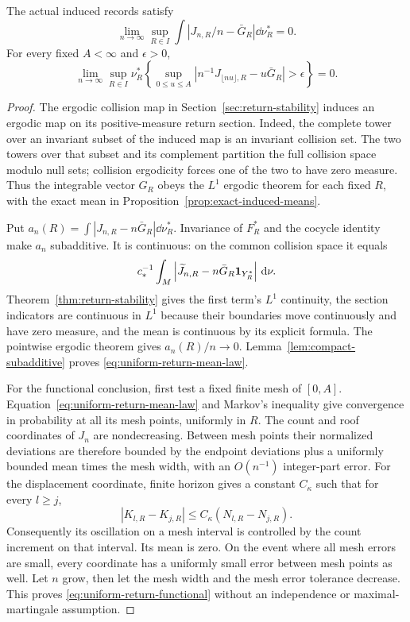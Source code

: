 \begin{theorem}
\label{thm:uniform-return-fluid}
The actual induced records satisfy
\begin{equation}\label{eq:uniform-return-mean-law}
 \lim_{n\to\infty}\sup_{R\in I}
       \int\left|J_{n,R}/n-\bar G_R\right|\dd\nu_R^*=0.
\end{equation}
For every fixed $A<\infty$ and $\epsilon>0$,
\begin{equation}\label{eq:uniform-return-functional}
 \lim_{n\to\infty}\sup_{R\in I}\nu_R^*\left\{
 \sup_{0\le u\le A}
 \left|n^{-1}J_{\lfloor nu\rfloor,R}-u\bar G_R\right|>\epsilon
 \right\}=0.
\end{equation}
\end{theorem}
\begin{proof}
The ergodic collision map in Section~\ref{sec:return-stability}
induces an ergodic map on its positive-measure return section. Indeed,
the complete tower over an invariant subset of the induced map is an
invariant collision set. The two towers over that subset and its
complement partition the full collision space modulo null sets;
collision ergodicity forces one of the two to have zero measure.
Thus the integrable vector $G_R$ obeys the $L^1$ ergodic theorem for
each fixed $R$, with the exact mean in
Proposition~\ref{prop:exact-induced-means}.

Put $a_n(R)=\int|J_{n,R}-n\bar G_R|\dd\nu_R^*$.
Invariance of $F_R^*$ and the cocycle identity make $a_n$ subadditive.
It is continuous: on the common collision space it equals
\[
 c_*^{-1}\int_M
 \left|\widetilde J_{n,R}-n\bar G_R\mathbf1_{Y_R^*}\right|\,\mathrm d\nu.
\]
Theorem~\ref{thm:return-stability} gives the first term's $L^1$
continuity, the section indicators are continuous in $L^1$ because
their boundaries move continuously and have zero measure, and the
mean is continuous by its explicit formula. The pointwise ergodic
theorem gives $a_n(R)/n\to0$. Lemma~\ref{lem:compact-subadditive}
proves \eqref{eq:uniform-return-mean-law}.

For the functional conclusion, first test a fixed finite mesh of
$[0,A]$. Equation~\eqref{eq:uniform-return-mean-law} and Markov's
inequality give convergence in probability at all its mesh points,
uniformly in $R$. The count and roof coordinates of $J_n$ are
nondecreasing. Between mesh points their normalized deviations are
therefore bounded by the endpoint deviations plus a uniformly bounded
mean times the mesh width, with an $O(n^{-1})$ integer-part error.
For the displacement coordinate, finite horizon gives a constant
$C_\kappa$ such that for every $l\ge j$,
\[
 |K_{l,R}-K_{j,R}|\le C_\kappa(N_{l,R}-N_{j,R}).
\]
Consequently its oscillation on a mesh interval is controlled by the
count increment on that interval. Its mean is zero. On the event
where all mesh errors are small, every coordinate has a uniformly
small error between mesh points as well. Let $n$ grow, then let the
mesh width and the mesh error tolerance decrease. This proves
\eqref{eq:uniform-return-functional} without an independence or
maximal-martingale assumption.
\end{proof}

